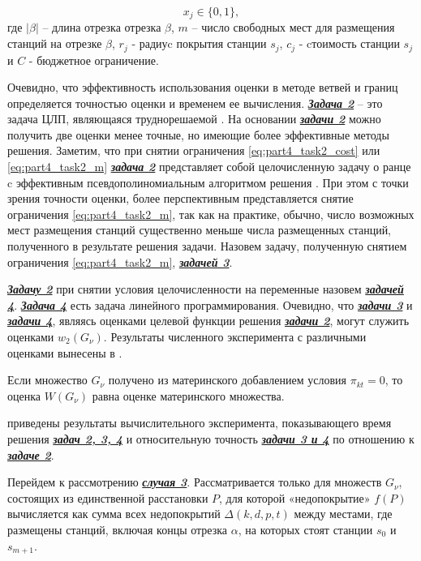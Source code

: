 \begin{displaymath}
    x_j \in \{0, 1\},
\end{displaymath}
где $|\beta|$ -- длина отрезка отрезка  $\beta$, $m$ -- число свободных мест для размещения станций на отрезке $\beta$, $r_j$ - радиуc покрытия станции $s_j$, $c_j$ - cтоимость станции $s_j$ и $C$ - бюджетное ограничение.

Очевидно, что эффективность использования оценки в методе ветвей и границ определяется точностью оценки и временем ее вычисления. \underline{\textit{\textbf{Задача 2}}} -- это задача ЦЛП, являющаяся труднорешаемой \cite{Gari}. На основании \underline{\textit{\textbf{задачи 2}}} можно получить две оценки менее точные, но имеющие более эффективные методы решения. Заметим, что при снятии ограничения \cref{eq:part4_task2_cost} или \cref{eq:part4_task2_m} \underline{\textit{\textbf{задача 2}}} представляет собой целочисленную задачу о ранце c эффективным псевдополиномиальным алгоритмом решения \cite{Gari}. При этом с точки зрения точности оценки, более перспективным представляется снятие ограничения \cref{eq:part4_task2_m}, так как на практике, обычно, число возможных мест размещения станций существенно меньше числа размещенных станций, полученного в результате решения задачи. Назовем задачу, полученную снятием ограничения \cref{eq:part4_task2_m}, \underline{\textit{\textbf{задачей 3}}}.

\underline{\textit{\textbf{Задачу 2}}} при снятии условия целочисленности на переменные назовем \underline{\textit{\textbf{задачей 4}}}. \underline{\textit{\textbf{Задача 4}}} есть задача линейного программирования. Очевидно, что \underline{\textit{\textbf{задачи 3}}} и \underline{\textit{\textbf{задачи 4}}}, являясь оценками целевой функции решения \underline{\textit{\textbf{задачи 2}}}, могут служить оценками $w_2 (G_\nu)$. Результаты численного эксперимента с различными оценками вынесены в .

Если множество $G_\nu$ получено из материнского добавлением условия $\pi_{kt}=0$, то оценка $W(G_\nu)$ равна оценке материнского множества.

 приведены результаты вычислительного эксперимента, показывающего время решения \underline{\textit{\textbf{задач 2, 3, 4}}} и относительную точность \underline{\textit{\textbf{задачи 3 и 4}}} по отношению к \underline{\textit{\textbf{задаче 2}}}.

Перейдем к рассмотрению \underline{\textit{\textbf{случая 3}}}. Рассматривается только для множеств $G_\nu$, состоящих из единственной расстановки $P$, для которой «недопокрытие» $f(P)$ вычисляется как сумма всех недопокрытий $\Delta(k,d,p,t)$ между местами, где размещены станций, включая концы отрезка $\alpha$, на которых стоят станции $s_0$ и $s_{m+1}$. 


